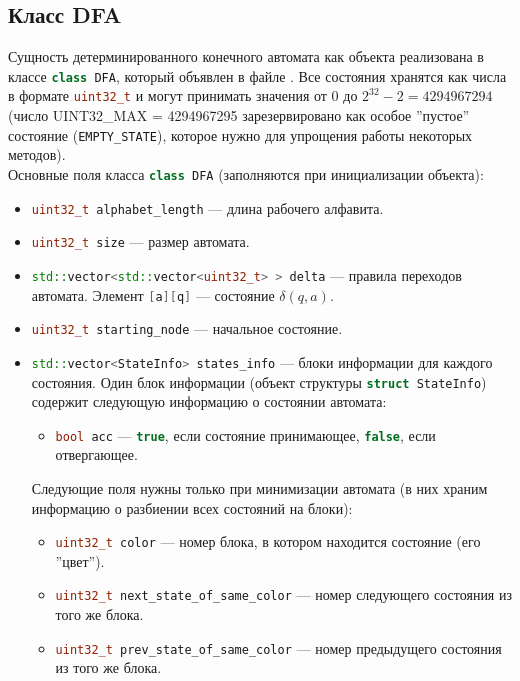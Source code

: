 \documentclass{article}
\begin{document}
\subsection{Класс DFA}
Сущность детерминированного конечного автомата как объекта реализована в классе \lstinline[language=C++]!class DFA!, который объявлен в файле . Все состояния хранятся как числа в формате \lstinline[language=C++]!uint32_t! и могут принимать значения от 0 до $2^{32} - 2 = 4294967294$ (число UINT32\_MAX = 4294967295 зарезервировано как особое ''пустое'' состояние (\lstinline[language=C++]!EMPTY_STATE!), которое нужно для упрощения работы некоторых методов).\\
Основные поля класса \lstinline[language=C++]!class DFA! (заполняются при инициализации объекта):
\begin{itemize}
  \item \lstinline[language=C++]!uint32_t alphabet_length! --- длина рабочего алфавита.
  \item \lstinline[language=C++]!uint32_t size! --- размер автомата.
  \item \lstinline[language=C++]!std::vector<std::vector<uint32_t> > delta! --- правила переходов автомата. Элемент \lstinline[language=C++]![a][q]! --- состояние $\delta(q, a)$.
  \item \lstinline[language=C++]!uint32_t starting_node! --- начальное состояние.
  \item \lstinline[language=C++]!std::vector<StateInfo> states_info! --- блоки информации для каждого состояния. Один блок информации (объект структуры \lstinline[language=C++]!struct StateInfo!) содержит следующую информацию о состоянии автомата:
  \begin{itemize}
    \item[\ding{118}] \lstinline[language=C++]!bool acc! --- \lstinline[language=C++]!true!, если состояние принимающее, \lstinline[language=C++]!false!, если отвергающее.
  \end{itemize}
  Следующие поля нужны только при минимизации автомата (в них храним информацию о разбиении  всех состояний на блоки):
  \begin{itemize}
    \item[\ding{118}] \lstinline[language=C++]!uint32_t color! --- номер блока, в котором находится состояние (его ''цвет'').
    \item[\ding{118}] \lstinline[language=C++]!uint32_t next_state_of_same_color! --- номер следующего состояния из того же блока.
    \item[\ding{118}] \lstinline[language=C++]!uint32_t prev_state_of_same_color! --- номер предыдущего состояния из того же блока.
  \end{itemize}
\end{itemize}
\end{document}
